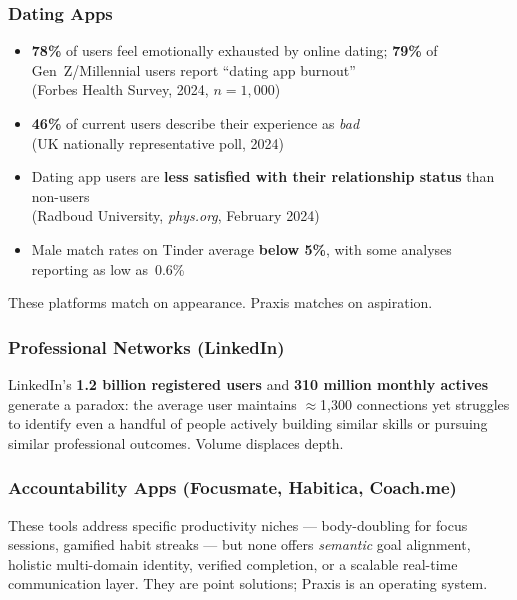 \documentclass[11pt,a4paper]{article}
\begin{document}
\subsubsection{Dating Apps}
\begin{statbox}
\begin{itemize}[nosep]
  \item \textbf{78\%} of users feel emotionally exhausted by online dating; \textbf{79\%} of Gen~Z/Millennial users report ``dating app burnout'' \\ {\small (Forbes Health Survey, 2024, $n=1{,}000$)}
  \item \textbf{46\%} of current users describe their experience as \textit{bad} \\ {\small (UK nationally representative poll, 2024)}
  \item Dating app users are \textbf{less satisfied with their relationship status} than non-users \\ {\small (Radboud University, \textit{phys.org}, February 2024)}
  \item Male match rates on Tinder average \textbf{below 5\%}, with some analyses reporting as low as~0.6\%
\end{itemize}
\end{statbox}

These platforms match on appearance. Praxis matches on aspiration.

\subsubsection{Professional Networks (LinkedIn)}
LinkedIn's \textbf{1.2 billion registered users} and \textbf{310 million monthly actives} generate a paradox: the average user maintains $\approx$1,300 connections yet struggles to identify even a handful of people actively building similar skills or pursuing similar professional outcomes. Volume displaces depth.

\subsubsection{Accountability Apps (Focusmate, Habitica, Coach.me)}
These tools address specific productivity niches — body-doubling for focus sessions, gamified habit streaks — but none offers \textit{semantic} goal alignment, holistic multi-domain identity, verified completion, or a scalable real-time communication layer. They are point solutions; Praxis is an operating system.
\end{document}
